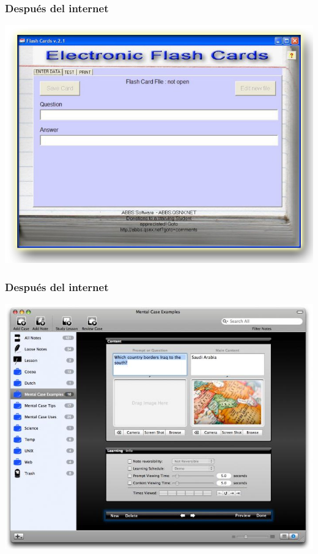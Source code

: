 \documentclass{beamer}
\begin{document}
\begin{frame}
	\frametitle{Después del internet}

	\begin{center}
		\includegraphics[width=.9\textwidth]{figures/flashcards.png}
	\end{center}
\end{frame}

\begin{frame}
	\frametitle{Después del internet}

	\begin{center}
		\includegraphics[width=.9\textwidth]{figures/flashcards2.jpg}
	\end{center}
\end{frame}
\end{document}
